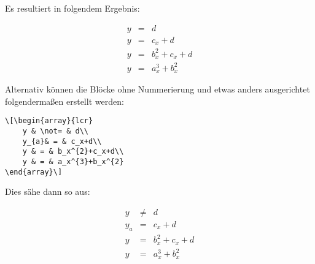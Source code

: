 Es resultiert in folgendem Ergebnis:

\begin{eqnarray}
    y & = & d\\
    y & = & c_x+d\\
    y & = & b_x^{2}+c_x+d\\
    y & = & a_x^{3}+b_x^{2}
\end{eqnarray}

Alternativ können die Blöcke ohne Nummerierung und etwas anders ausgerichtet folgendermaßen erstellt werden:

\begin{lstlisting}
\[\begin{array}{lcr}
    y & \not= & d\\
    y_{a}& = & c_x+d\\
    y & = & b_x^{2}+c_x+d\\
    y & = & a_x^{3}+b_x^{2}
\end{array}\]
\end{lstlisting}

Dies sähe dann so aus:

\[\begin{array}{lcr}
    y & \not= & d\\
    y_{a}& = & c_x+d\\
    y & = & b_x^{2}+c_x+d\\
    y & = & a_x^{3}+b_x^{2}
\end{array}\]